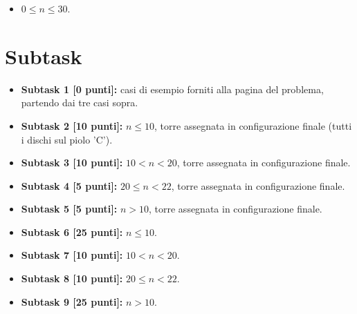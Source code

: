 
\begin{itemize}[nolistsep, noitemsep]
  \item $0 \le n \le 30$.
\end{itemize}
  
\section*{Subtask}

  \begin{itemize}
    \item \textbf{Subtask 1 [0 punti]:} casi di esempio forniti alla pagina del problema, partendo dai tre casi sopra.
    \item \textbf{Subtask 2 [10 punti]:} $n \le 10$, torre assegnata in configurazione finale (tutti i dischi sul piolo 'C').
    \item \textbf{Subtask 3 [10 punti]:} $10 < n < 20$, torre assegnata in configurazione finale.
    \item \textbf{Subtask 4 [5 punti]:} $20 \le n < 22$, torre assegnata in configurazione finale.
    \item \textbf{Subtask 5 [5 punti]:} $n > 10$, torre assegnata in configurazione finale.
    \item \textbf{Subtask 6 [25 punti]:} $n \le 10$.
    \item \textbf{Subtask 7 [10 punti]:} $10 < n < 20$.
    \item \textbf{Subtask 8 [10 punti]:} $20 \le n < 22$.
    \item \textbf{Subtask 9 [25 punti]:} $n > 10$.
  \end{itemize}
  
